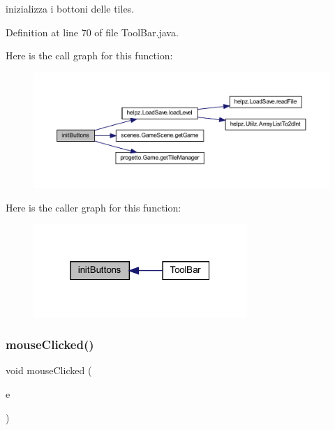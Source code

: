 inizializza i bottoni delle tiles. 



Definition at line 70 of file Tool\+Bar.\+java.

Here is the call graph for this function\+:
\nopagebreak
\begin{figure}[H]
\begin{center}
\leavevmode
\includegraphics[width=350pt]{classui_1_1_tool_bar_a27d3ba5afb772cc36c9a432c28975ace_cgraph}
\end{center}
\end{figure}
Here is the caller graph for this function\+:\nopagebreak
\begin{figure}[H]
\begin{center}
\leavevmode
\includegraphics[width=229pt]{classui_1_1_tool_bar_a27d3ba5afb772cc36c9a432c28975ace_icgraph}
\end{center}
\end{figure}
\mbox{\label{classui_1_1_tool_bar_a45d56bd84238e8b56589dfc732e2b2cf}} 
\subsubsection{\texorpdfstring{mouse\+Clicked()}{mouseClicked()}}
{\footnotesize\ttfamily void mouse\+Clicked (\begin{DoxyParamCaption}\item[{Mouse\+Event}]{e }\end{DoxyParamCaption})}



